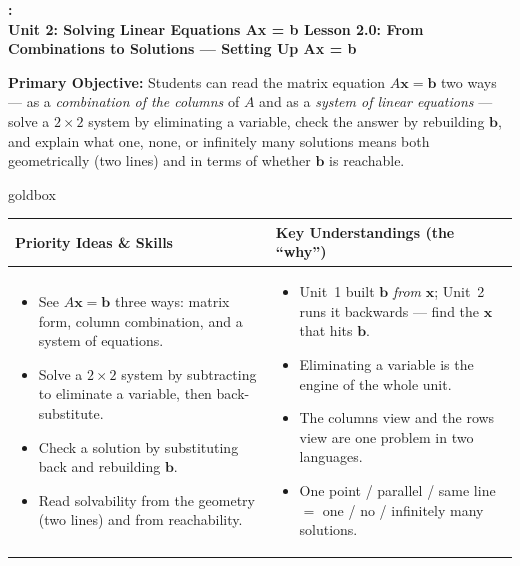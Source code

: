 \documentclass[10pt]{article}
\newcommand{\xx}{\mathbf{x}}
\newcommand{\bb}{\mathbf{b}}
\newcommand{\UnitNumberName}{Unit 2: Solving Linear Equations Ax = b \quad}
\newcommand{\LessonNumberName}{Lesson 2.0: From Combinations to Solutions --- Setting Up Ax = b}
\begin{document}
\begin{center}
    {\Large\bfseries \CourseName: \SchoolYear \\
    {\small\bfseries \UnitNumberName \LessonNumberName}}
\end{center}

\begin{tcolorbox}[colback=blush, colframe=burgundy, boxrule=0.9pt, arc=2mm,
    left=2mm, right=2mm, top=1.5mm, bottom=1.5mm]
    \textbf{Primary Objective:} Students can read the matrix equation $A\xx=\bb$ two ways ---
    as a \emph{combination of the columns} of $A$ and as a \emph{system of linear equations} ---
    solve a $2\times 2$ system by eliminating a variable, check the answer by rebuilding $\bb$,
    and explain what one, none, or infinitely many solutions means both geometrically (two lines)
    and in terms of whether $\bb$ is reachable.
\end{tcolorbox}

\renewcommand{\arraystretch}{1.4}
\begin{skillbox}{goldbox}
\begin{tabularx}{\linewidth}{@{}X|X@{}}
\textbf{Priority Ideas \& Skills} & \textbf{Key Understandings (the ``why'')} \\[2pt]
\hline
\vspace{-6pt}
\begin{itemize}[leftmargin=1.1em, nosep, after=\vspace{2pt}]
  \item See $A\xx=\bb$ three ways: matrix form, column combination, and a system of equations.
  \item Solve a $2\times 2$ system by subtracting to eliminate a variable, then back-substitute.
  \item Check a solution by substituting back and rebuilding $\bb$.
  \item Read solvability from the geometry (two lines) and from reachability.
\end{itemize}
&
\vspace{-6pt}
\begin{itemize}[leftmargin=1.1em, nosep, after=\vspace{2pt}]
  \item Unit~1 built $\bb$ \emph{from} $\xx$; Unit~2 runs it backwards --- find the $\xx$ that hits $\bb$.
  \item Eliminating a variable is the engine of the whole unit.
  \item The columns view and the rows view are one problem in two languages.
  \item One point / parallel / same line $=$ one / no / infinitely many solutions.
\end{itemize}
\end{tabularx}
\end{skillbox}
\end{document}
